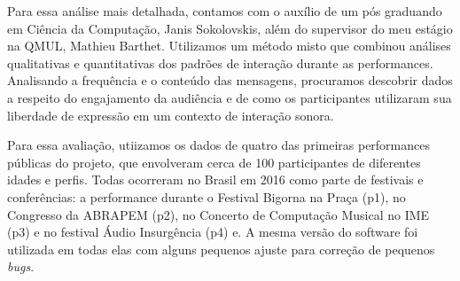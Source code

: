 
Para essa análise mais detalhada, contamos com o auxílio de um pós graduando em Ciência da Computação, Janis Sokolovskis, além do supervisor do meu estágio na QMUL, Mathieu Barthet. Utilizamos um método misto que combinou análises qualitativas e quantitativas dos padrões de interação durante as performances. Analisando a frequência e o conteúdo das mensagens, procuramos descobrir dados a respeito do engajamento da audiência e de como os participantes utilizaram sua liberdade de expressão em um contexto de interação sonora. 


Para essa avaliação, utiizamos os dados de quatro das primeiras performances públicas do projeto, que envolveram cerca de 100 participantes de diferentes idades e perfis. Todas ocorreram no Brasil em 2016 como parte de festivais e conferências: a performance durante o Festival Bigorna na Praça (p1), no Congresso da ABRAPEM (p2), no Concerto de Computação Musical no IME (p3) e no festival Áudio Insurgência (p4) e. A mesma versão do software foi utilizada em todas elas com alguns pequenos ajuste para correção de pequenos \emph{bugs}.





